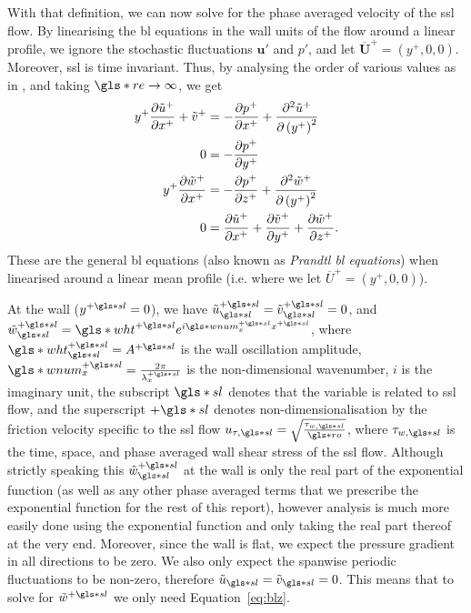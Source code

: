 With that definition, we can now solve for the phase averaged velocity of the \gls*{ssl} flow. By linearising the \gls*{bl} equations in the wall units of the flow around a linear profile, we ignore the stochastic fluctuations $\mathbf{u'} $ and $p'$, and let $\overline{\mathbf{U} }^{+} = (y^{+},0,0)$. Moreover, \gls*{ssl} is time invariant. Thus, by analysing the order of various values as in \cite{schlichting2016}, and taking $\gls*{re}\to \infty$, we get
\begin{align}
	y^{+} \pdv{\tilde{u}^{+}}{x^{+}} + \tilde{v}^{+} &= -\pdv{p^{+}}{x^{+}} + \pdv[2]{\tilde{u}^{+}}{\left(y^{+}\right)} \label{eq:blx}\\
	0 &= -\pdv{p^{+}}{y^{+}}  \label{eq:bly}\\
	y^{+} \pdv{\tilde{w}^{+}}{x^{+}} &= -\pdv{p^{+}}{z^{+}} + \pdv[2]{\tilde{w}^{+}}{\left( y^{+} \right) } \label{eq:blz}\\
	0 &= \pdv{\tilde{u}^{+}}{x^{+}} +\pdv{\tilde{v}^{+}}{y^{+}} +\pdv{\tilde{w}^{+}}{z^{+}} \label{eq:blc}
.\end{align}
These are the general \gls*{bl} equations (also known as \textit{Prandtl \gls*{bl} equations}) when linearised around a linear mean profile (i.e. where we let $\overline{U}^{+}=\left(y^{+},0,0\right)$).


At the wall ($y\ps=0$), we have $\tilde{u}\ssl\ps=\tilde{v}\ssl\ps=0$, and $\tilde{w}\ssl\ps=\gls*{wht}\ps e^{i \gls*{wnum}_x\ps x\ps}$, where $\gls*{wht}\ps\ssl=A\ps$ is the wall oscillation amplitude, $\gls*{wnum}_x\ps = \frac{2\pi}{\lambda_x\ps}$ is the non-dimensional wavenumber, $i$ is the imaginary unit, the subscript $\gls*{sl}$ denotes that the variable is related to \gls*{ssl} flow, and the superscript $+\gls*{sl}$ denotes non-dimensionalisation by the friction velocity specific to the \gls*{ssl} flow $u_{\tau,\gls*{sl}}=\sqrt{\frac{\tau_{w,\gls*{sl}}}{\gls*{ro}}} $, where $\tau_{w,\gls*{sl}}$ is the time, space, and phase averaged wall shear stress of the  \gls*{ssl} flow. Although strictly speaking this $\tilde{w}\ssl\ps$ at the wall is only the real part of the exponential function (as well as any other phase averaged terms that we prescribe the exponential function for the rest of this report), however analysis is much more easily done using the exponential function and only taking the real part thereof at the very end. Moreover, since the wall is flat, we expect the pressure gradient in all directions to be zero. We also only expect the spanwise periodic fluctuations to be non-zero, therefore $\tilde{u}\ssl=\tilde{v}\ssl=0  $. This means that to solve for $\tilde{w}\ps$ we only need Equation~\eqref{eq:blz}.

